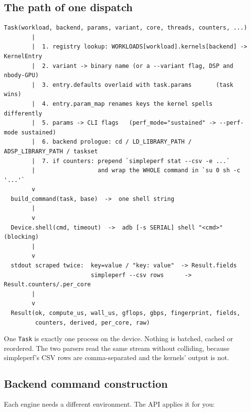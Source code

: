 \documentclass[11pt,a4paper]{article}
\newcommand{\code}[1]{\texttt{\let\_\breakableunderscore #1}}
\newcommand{\breakableunderscore}{\textunderscore\allowbreak}
\begin{document}
\subsection{The path of one dispatch}

\begin{lstlisting}[style=plain]
  Task(workload, backend, params, variant, core, threads, counters, ...)
        |
        |  1. registry lookup: WORKLOADS[workload].kernels[backend] -> KernelEntry
        |  2. variant -> binary name (or a --variant flag, DSP and nbody-GPU)
        |  3. entry.defaults overlaid with task.params       (task wins)
        |  4. entry.param_map renames keys the kernel spells differently
        |  5. params -> CLI flags   (perf_mode="sustained" -> --perf-mode sustained)
        |  6. backend prologue: cd / LD_LIBRARY_PATH / ADSP_LIBRARY_PATH / taskset
        |  7. if counters: prepend `simpleperf stat --csv -e ...`
        |                  and wrap the WHOLE command in `su 0 sh -c '...'`
        v
  build_command(task, base)  ->  one shell string
        |
        v
  Device.shell(cmd, timeout)  ->  adb [-s SERIAL] shell "<cmd>"   (blocking)
        |
        v
  stdout scraped twice:  key=value / "key: value"  -> Result.fields
                         simpleperf --csv rows      -> Result.counters/.per_core
        |
        v
  Result(ok, compute_us, wall_us, gflops, gbps, fingerprint, fields,
         counters, derived, per_core, raw)
\end{lstlisting}

\noindent One \code{Task} is exactly one process on the device. Nothing is
batched, cached or reordered. The two parsers read the same stream without
colliding, because simpleperf's CSV rows are comma-separated and the kernels'
output is not.

\subsection{Backend command construction}

Each engine needs a different environment. The API applies it for you:
\end{document}
